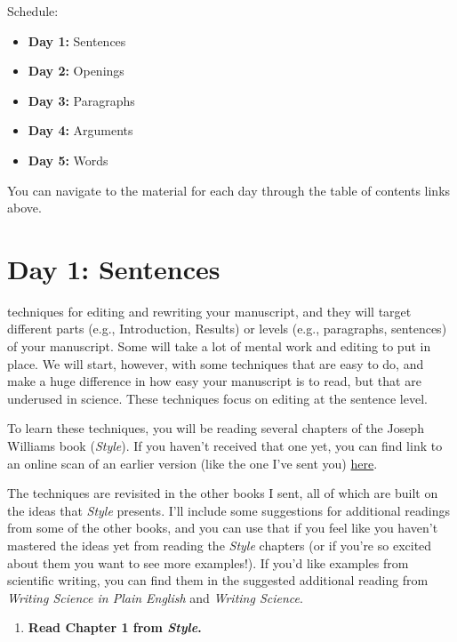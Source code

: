 \documentclass[]{tufte-book}
\providecommand{\tightlist}{%
  \setlength{\itemsep}{0pt}\setlength{\parskip}{0pt}}
\begin{document}
Schedule:

\begin{itemize}
\tightlist
\item
  \textbf{Day 1:} Sentences
\item
  \textbf{Day 2:} Openings
\item
  \textbf{Day 3:} Paragraphs
\item
  \textbf{Day 4:} Arguments
\item
  \textbf{Day 5:} Words
\end{itemize}

You can navigate to the material for each day through the table of contents links
above.

\hypertarget{day-1-sentences}{%
\chapter{Day 1: Sentences}\label{day-1-sentences}}

 techniques for editing and rewriting
your manuscript, and they will target different parts (e.g., Introduction, Results) or
levels (e.g., paragraphs, sentences) of your manuscript. Some will take a lot of mental
work and editing to put in place. We will start, however, with some techniques that
are easy to do, and make a huge difference in how easy your manuscript is to read, but
that are underused in science. These techniques focus on editing at the sentence level.

To learn these techniques, you will be reading several chapters of the Joseph
Williams book (\emph{Style}). If you haven't received that one yet, you can find link
to an online scan of an earlier version (like the one I've sent you)
\href{https://sites.duke.edu/niou/files/2014/07/WilliamsJosephM1990StyleTowardClarityandGrace.pdf}{here}.

The techniques are revisited in the other books I sent, all of which are built on
the ideas that \emph{Style} presents. I'll include some suggestions for additional readings
from some of the other books, and you can use that if you feel like you haven't mastered
the ideas yet from reading the \emph{Style} chapters (or if you're so excited about them you
want to see more examples!). If you'd like examples from scientific writing, you can find
them in the suggested additional reading from \emph{Writing Science in Plain English} and
\emph{Writing Science}.

\begin{enumerate}
\def\labelenumi{\arabic{enumi}.}
\tightlist
\item
  \textbf{Read Chapter 1 from \emph{Style}.}
\end{enumerate}
\end{document}
